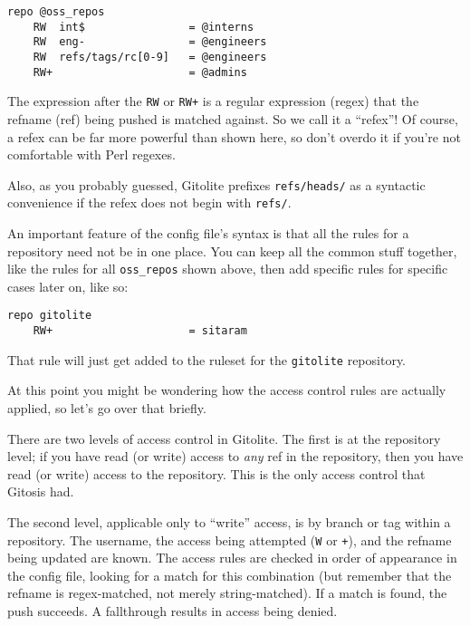 \documentclass[a4paper]{book}
\newcounter{tab}[chapter]
\begin{document}
\begin{shaded}\begin{verbatim}
repo @oss_repos
    RW  int$                = @interns
    RW  eng-                = @engineers
    RW  refs/tags/rc[0-9]   = @engineers
    RW+                     = @admins
\end{verbatim}\end{shaded}

The expression after the \texttt{RW} or \texttt{RW+} is a regular expression (regex) that the refname (ref) being pushed is matched against. So we call it a “refex”! Of course, a refex can be far more powerful than shown here, so don't overdo it if you're not comfortable with Perl regexes.

Also, as you probably guessed, Gitolite prefixes \texttt{refs/heads/} as a syntactic convenience if the refex does not begin with \texttt{refs/}.

An important feature of the config file's syntax is that all the rules for a repository need not be in one place. You can keep all the common stuff together, like the rules for all \texttt{oss\_repos} shown above, then add specific rules for specific cases later on, like so:

\begin{shaded}\begin{verbatim}
repo gitolite
    RW+                     = sitaram
\end{verbatim}\end{shaded}

That rule will just get added to the ruleset for the \texttt{gitolite} repository.

At this point you might be wondering how the access control rules are actually applied, so let's go over that briefly.

There are two levels of access control in Gitolite. The first is at the repository level; if you have read (or write) access to \emph{any} ref in the repository, then you have read (or write) access to the repository. This is the only access control that Gitosis had.

The second level, applicable only to “write” access, is by branch or tag within a repository. The username, the access being attempted (\texttt{W} or \texttt{+}), and the refname being updated are known. The access rules are checked in order of appearance in the config file, looking for a match for this combination (but remember that the refname is regex-matched, not merely string-matched). If a match is found, the push succeeds. A fallthrough results in access being denied.
\end{document}
